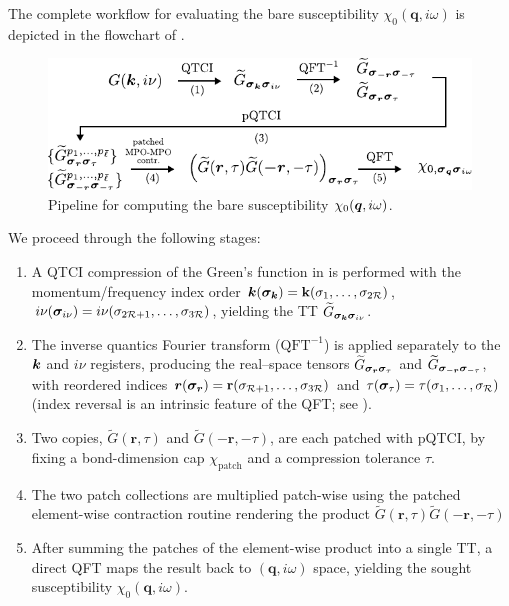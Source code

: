 The complete workflow for evaluating the bare susceptibility \(\chi_{0}(\mathbf q,i\omega)\) is depicted in the flowchart of .  


\begin{figure}[htbp]
    \centering
    \includegraphics{figures/bubbleFlowchart.pdf}
    \caption{Pipeline for computing the bare susceptibility \(\chi_{0}(\boldsymbol{q},i\omega)\).}
    \label{fig:bubbleFlowchart}
\end{figure}

We proceed through the following stages:

\begingroup
\renewcommand{\labelenumi}{(\arabic{enumi})}
\begin{enumerate}
    \item A QTCI compression of the Green’s function in  is performed with the momentum/frequency
    index order \(\boldsymbol{k}(\boldsymbol{\sigma}_{\boldsymbol{k}})=\mathbf k(\sigma_{1},\dots,\sigma_{2\mathcal R})\),
    \(i\nu(\boldsymbol{\sigma}_{i\nu})=i\nu(\sigma_{2\mathcal R+1},\dots,\sigma_{3\mathcal R})\), yielding the TT \(\widetilde G_{\boldsymbol{\sigma}_{\boldsymbol{k}}\boldsymbol{\sigma}_{i\nu}}\).
    \item The inverse quantics Fourier transform ($\text{QFT}^{-1}$) is applied separately to the \(\boldsymbol{k}\) and \(i\nu\) registers, producing the real–space tensors \(\widetilde G_{\boldsymbol{\sigma}_{\boldsymbol{r}}\boldsymbol{\sigma}_{\tau}}\) and \(\widetilde G_{\boldsymbol{\sigma}_{-\boldsymbol{r}}\boldsymbol{\sigma}_{-\tau}}\), with reordered indices \(\boldsymbol{r}(\boldsymbol{\sigma}_{\boldsymbol{r}})=\mathbf r(\sigma_{\mathcal R+1},\dots,\sigma_{3\mathcal R})\)
    and \(\tau(\boldsymbol{\sigma}_{\tau})=\tau(\sigma_{1},\dots,\sigma_{\mathcal R})\)
    (index reversal is an intrinsic feature of the QFT; see ).
    \item Two copies, \(\widetilde G(\mathbf r,\tau)\) and \(\widetilde G(-\mathbf r,-\tau)\), are each patched with pQTCI, by fixing a bond-dimension cap \(\chi_{\text{patch}}\) and a compression tolerance $\tau$. 
    \item The two patch collections are multiplied patch-wise using the patched element-wise contraction routine rendering the product \(\widetilde G(\mathbf r,\tau)\widetilde G(-\mathbf r,-\tau) \)
    \item After summing the patches of the element-wise product into a
    single TT, a direct QFT maps the result back to \((\mathbf q,i\omega)\)
    space, yielding the sought susceptibility
    \(\chi_{0}(\mathbf q,i\omega)\).
\end{enumerate}
\endgroup


